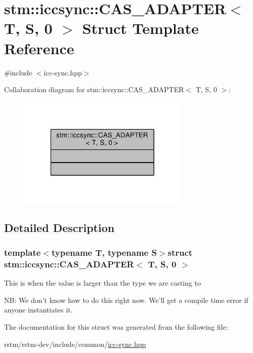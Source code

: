 \hypertarget{structstm_1_1iccsync_1_1CAS__ADAPTER_3_01T_00_01S_00_010_01_4}{\section{stm\-:\-:iccsync\-:\-:C\-A\-S\-\_\-\-A\-D\-A\-P\-T\-E\-R$<$ T, S, 0 $>$ Struct Template Reference}
\label{structstm_1_1iccsync_1_1CAS__ADAPTER_3_01T_00_01S_00_010_01_4}
}


{\ttfamily \#include $<$icc-\/sync.\-hpp$>$}



Collaboration diagram for stm\-:\-:iccsync\-:\-:C\-A\-S\-\_\-\-A\-D\-A\-P\-T\-E\-R$<$ T, S, 0 $>$\-:
\nopagebreak
\begin{figure}[H]
\begin{center}
\leavevmode
\includegraphics[width=232pt]{structstm_1_1iccsync_1_1CAS__ADAPTER_3_01T_00_01S_00_010_01_4__coll__graph}
\end{center}
\end{figure}


\subsection{Detailed Description}
\subsubsection*{template$<$typename T, typename S$>$struct stm\-::iccsync\-::\-C\-A\-S\-\_\-\-A\-D\-A\-P\-T\-E\-R$<$ T, S, 0 $>$}

This is when the value is larger than the type we are casting to

N\-B\-: We don't know how to do this right now. We'll get a compile time error if anyone instantiates it. 

The documentation for this struct was generated from the following file\-:\begin{DoxyCompactItemize}
\item 
rstm/rstm-\/dev/include/common/\hyperlink{icc-sync_8hpp}{icc-\/sync.\-hpp}\end{DoxyCompactItemize}
